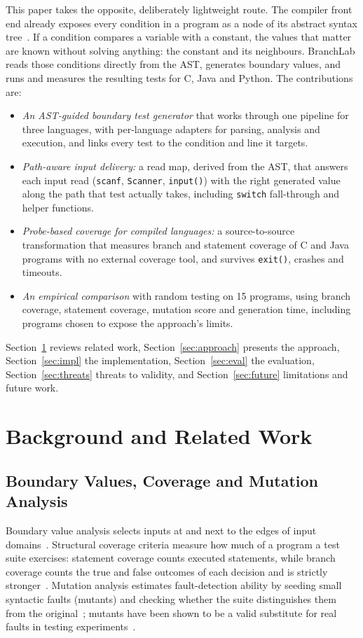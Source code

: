 \documentclass[conference]{IEEEtran}
\begin{document}
This paper takes the opposite, deliberately lightweight route. The compiler front end already exposes every
condition in a program as a node of its abstract syntax tree~\cite{aho2006compilers}. If a condition compares a
variable with a constant, the values that matter are known without solving anything: the constant and its
neighbours. BranchLab reads those conditions directly from the AST, generates boundary values, and runs and
measures the resulting tests for C, Java and Python. The contributions are:
\begin{itemize}
\item \emph{An AST-guided boundary test generator} that works through one pipeline for three languages, with
per-language adapters for parsing, analysis and execution, and links every test to the condition and line it
targets.
\item \emph{Path-aware input delivery:} a read map, derived from the AST, that answers each input read
(\texttt{scanf}, \texttt{Scanner}, \texttt{input()}) with the right generated value along the path that test
actually takes, including \texttt{switch} fall-through and helper functions.
\item \emph{Probe-based coverage for compiled languages:} a source-to-source transformation that measures branch
and statement coverage of C and Java programs with no external coverage tool, and survives \texttt{exit()},
crashes and timeouts.
\item \emph{An empirical comparison} with random testing on 15 programs, using branch coverage, statement
coverage, mutation score and generation time, including programs chosen to expose the approach's limits.
\end{itemize}
Section~\ref{sec:related} reviews related work, Section~\ref{sec:approach} presents the approach,
Section~\ref{sec:impl} the implementation, Section~\ref{sec:eval} the evaluation, Section~\ref{sec:threats}
threats to validity, and Section~\ref{sec:future} limitations and future work.

\section{Background and Related Work}\label{sec:related}
\subsection{Boundary Values, Coverage and Mutation Analysis}
Boundary value analysis selects inputs at and next to the edges of input domains~\cite{myers2011art}.
Structural coverage criteria measure how much of a program a test suite exercises: statement coverage counts
executed statements, while branch coverage counts the true and false outcomes of each decision and is strictly
stronger~\cite{zhu1997coverage}. Mutation analysis estimates fault-detection ability by seeding small syntactic
faults (mutants) and checking whether the suite distinguishes them from the
original~\cite{demillo1978hints,jia2011mutation}; mutants have been shown to be a valid substitute for real
faults in testing experiments~\cite{andrews2005mutation}.
\end{document}

